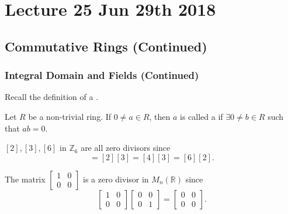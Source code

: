 \chapter{Lecture 25 Jun 29th 2018}%
\label{chp:lecture_25_jun_29th_2018}

\section{Commutative Rings (Continued)}%
\label{sec:commutative_rings_continued}

\subsection{Integral Domain and Fields (Continued)}%
\label{sub:integral_domain_and_fields_continued}

Recall the definition of a .

\begin{defnnonum}
\label{defnnonum:zero_divisor}
Let $R$ be a non-trivial ring. If $0 \neq a \in R$, then $a$ is called a  if $\exists 0 \neq b \in R$ such that $ab = 0$.
\end{defnnonum}

\begin{eg}
  $[2], [3], [6]$ in $\mathbb{Z}_6$ are all zero divisors since
  \begin{equation*}
    [0] = [2][3] = [4][3] = [6][2].
  \end{equation*}
\end{eg}

\begin{eg}
  The matrix $\begin{bmatrix} 1 & 0 \\ 0 & 0 \end{bmatrix}$ is a zero divisor in $M_n(\mathbb{R})$ since
  \begin{equation*}
    \begin{bmatrix}
      1 & 0 \\ 0 & 0
    \end{bmatrix} \begin{bmatrix}
      0 & 0 \\ 0 & 1
    \end{bmatrix} = \begin{bmatrix}
      0 & 0 \\ 0 & 0
    \end{bmatrix}.
  \end{equation*}
\end{eg}

